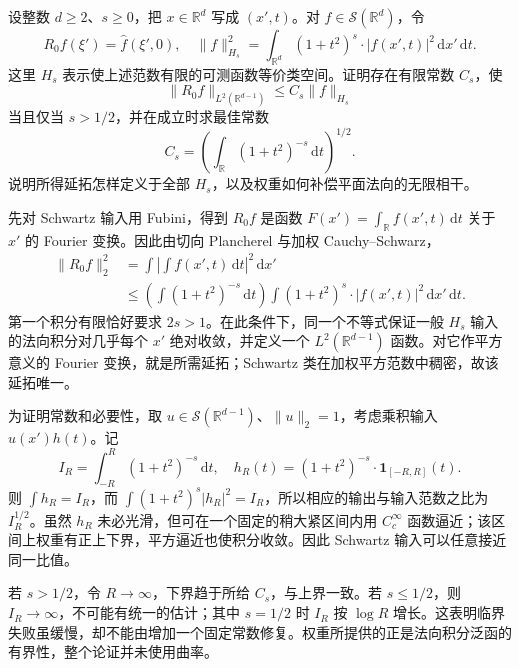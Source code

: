 \begin{exercise}\label{b2:ex:23-new-1}
设整数 \(d\geq2\)、\(s\geq0\)，把 \(x\in\mathbb R^d\) 写成 \((x',t)\)。对 \(f\in\mathcal S(\mathbb R^d)\)，令
\[
 R_0f(\xi')=\widehat f(\xi',0),
 \quad
 \|f\|_{H_s}^2=\int_{\mathbb R^d}(1+t^2)^s\cdot|f(x',t)|^2\,\mathrm dx'\,\mathrm dt.
\]
这里 \(H_s\) 表示使上述范数有限的可测函数等价类空间。证明存在有限常数 \(C_s\)，使
\[
 \|R_0f\|_{L^2(\mathbb R^{d-1})}\leq C_s\|f\|_{H_s}
\]
当且仅当 \(s>1/2\)，并在成立时求最佳常数
\[
 C_s=\left(\int_{\mathbb R}(1+t^2)^{-s}\,\mathrm dt\right)^{1/2}.
\]
说明所得延拓怎样定义于全部 \(H_s\)，以及权重如何补偿平面法向的无限相干。
\end{exercise}
\begin{solution}
先对 Schwartz 输入用 Fubini，得到 \(R_0f\) 是函数
\(F(x')=\int_{\mathbb R}f(x',t)\,\mathrm dt\) 关于 \(x'\) 的 Fourier 变换。因此由切向 Plancherel 与加权 Cauchy--Schwarz，
\[
 \begin{aligned}
 \|R_0f\|_2^2
 &=\int\left|\int f(x',t)\,\mathrm dt\right|^2\,\mathrm dx'\\
 &\leq\left(\int(1+t^2)^{-s}\,\mathrm dt\right)
       \int(1+t^2)^s\cdot|f(x',t)|^2\,\mathrm dx'\,\mathrm dt.
 \end{aligned}
\]
第一个积分有限恰好要求 \(2s>1\)。在此条件下，同一个不等式保证一般 \(H_s\) 输入的法向积分对几乎每个 \(x'\) 绝对收敛，并定义一个 \(L^2(\mathbb R^{d-1})\) 函数。对它作平方意义的 Fourier 变换，就是所需延拓；Schwartz 类在加权平方范数中稠密，故该延拓唯一。

为证明常数和必要性，取 \(u\in\mathcal S(\mathbb R^{d-1})\)、\(\|u\|_2=1\)，考虑乘积输入 \(u(x')h(t)\)。记
\[
 I_R=\int_{-R}^R(1+t^2)^{-s}\,\mathrm dt,
 \quad h_R(t)=(1+t^2)^{-s}\cdot\mathbf1_{[-R,R]}(t).
\]
则 \(\int h_R=I_R\)，而 \(\int(1+t^2)^s|h_R|^2=I_R\)，所以相应的输出与输入范数之比为 \(I_R^{1/2}\)。虽然 \(h_R\) 未必光滑，但可在一个固定的稍大紧区间内用 \(C_c^\infty\) 函数逼近；该区间上权重有正上下界，平方逼近也使积分收敛。因此 Schwartz 输入可以任意接近同一比值。

若 \(s>1/2\)，令 \(R\to\infty\)，下界趋于所给 \(C_s\)，与上界一致。若 \(s\leq1/2\)，则 \(I_R\to\infty\)，不可能有统一的估计；其中 \(s=1/2\) 时 \(I_R\) 按 \(\log R\) 增长。这表明临界失败虽缓慢，却不能由增加一个固定常数修复。权重所提供的正是法向积分泛函的有界性，整个论证并未使用曲率。
\end{solution}

